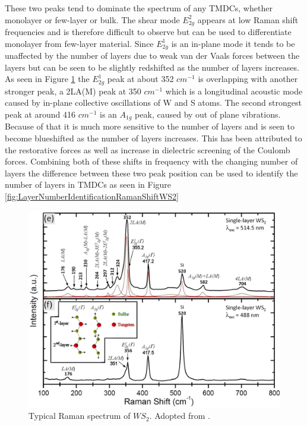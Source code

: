 	These two peaks tend to dominate the spectrum of any TMDCs, whether monolayer or few-layer or bulk. The shear mode $E^2_{2g}$ appears at low Raman shift frequencies and is therefore difficult to observe but can be used to differentiate monolayer from few-layer material. Since $E^1_{2g}$ is an in-plane mode it tends to be unaffected by the number of layers due to weak van der Vaals forces between the layers but can be seen to be slightly redshifted as the number of layers increases. As seen in Figure \ref{fig:TypicalRamanSpectrumWS2} the $E^1_{2g}$ peak at about 352 $cm^{-1}$ is overlapping with another stronger peak, a 2LA(M) peak at 350 $cm^{-1}$ which is a longitudinal acoustic mode caused by in-plane collective oscillations of W and S atoms. The second strongest peak at around 416 $cm^{-1}$ is an $A_{1g}$ peak, caused by out of plane vibrations. Because of that it is much more sensitive to the number of layers and is seen to become blueshifted as the number of layers increases. This has been attributed to the restorative forces as well as increase in dielectric screening of the Coulomb forces. Combining both of these shifts in frequency with the changing number of layers the difference between these two peak position can be used to identify the number of layers in TMDCs as seen in Figure \ref{fig:LayerNumberIdentificationRamanShiftWS2}
	
\begin{figure}[h]
	\begin{center}
		\includegraphics[scale=0.3]{RamanPeaksIdentification.png}
		\caption{Typical Raman spectrum of $WS_2$. Adopted from \cite{Berkdemir2013}.}
		\label{fig:TypicalRamanSpectrumWS2}
	\end{center}
\end{figure}
	
